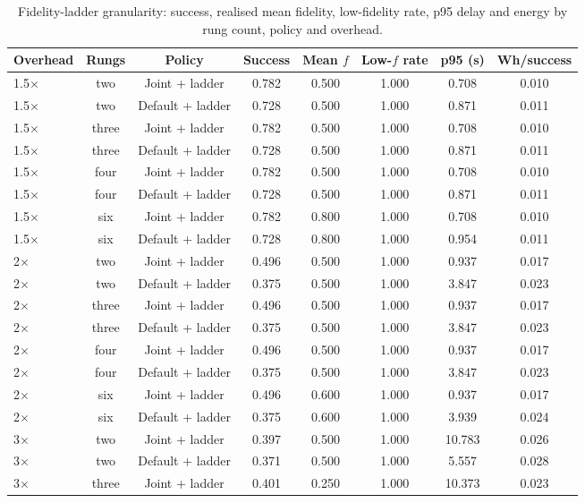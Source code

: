 \begin{table}
\centering
\footnotesize
\caption{Fidelity-ladder granularity: success, realised mean fidelity, low-fidelity rate, p95 delay and energy by rung count, policy and overhead.}
\label{tab:p2-ladder}
\begin{tabular}{lccccccc}
\toprule
Overhead & Rungs & Policy & Success & Mean $f$ & Low-$f$ rate & p95 (s) & Wh/success \\
\midrule
1.5$\times$ & two & Joint + ladder & 0.782 & 0.500 & 1.000 & 0.708 & 0.010 \\
1.5$\times$ & two & Default + ladder & 0.728 & 0.500 & 1.000 & 0.871 & 0.011 \\
1.5$\times$ & three & Joint + ladder & 0.782 & 0.500 & 1.000 & 0.708 & 0.010 \\
1.5$\times$ & three & Default + ladder & 0.728 & 0.500 & 1.000 & 0.871 & 0.011 \\
1.5$\times$ & four & Joint + ladder & 0.782 & 0.500 & 1.000 & 0.708 & 0.010 \\
1.5$\times$ & four & Default + ladder & 0.728 & 0.500 & 1.000 & 0.871 & 0.011 \\
1.5$\times$ & six & Joint + ladder & 0.782 & 0.800 & 1.000 & 0.708 & 0.010 \\
1.5$\times$ & six & Default + ladder & 0.728 & 0.800 & 1.000 & 0.954 & 0.011 \\
2$\times$ & two & Joint + ladder & 0.496 & 0.500 & 1.000 & 0.937 & 0.017 \\
2$\times$ & two & Default + ladder & 0.375 & 0.500 & 1.000 & 3.847 & 0.023 \\
2$\times$ & three & Joint + ladder & 0.496 & 0.500 & 1.000 & 0.937 & 0.017 \\
2$\times$ & three & Default + ladder & 0.375 & 0.500 & 1.000 & 3.847 & 0.023 \\
2$\times$ & four & Joint + ladder & 0.496 & 0.500 & 1.000 & 0.937 & 0.017 \\
2$\times$ & four & Default + ladder & 0.375 & 0.500 & 1.000 & 3.847 & 0.023 \\
2$\times$ & six & Joint + ladder & 0.496 & 0.600 & 1.000 & 0.937 & 0.017 \\
2$\times$ & six & Default + ladder & 0.375 & 0.600 & 1.000 & 3.939 & 0.024 \\
3$\times$ & two & Joint + ladder & 0.397 & 0.500 & 1.000 & 10.783 & 0.026 \\
3$\times$ & two & Default + ladder & 0.371 & 0.500 & 1.000 & 5.557 & 0.028 \\
3$\times$ & three & Joint + ladder & 0.401 & 0.250 & 1.000 & 10.373 & 0.023 \\

\end{tabular}
\end{table}
